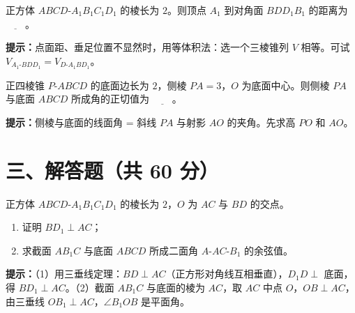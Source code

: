 \documentclass{exam-zh}
\begin{document}
\begin{question}[points=10]
  正方体 $ABCD\text{-}A_1B_1C_1D_1$ 的棱长为 $2$。则顶点 $A_1$ 到对角面 $BDD_1B_1$ 的距离为 $\underline{\hspace{2em}}$。
  \begin{hintbox}
\textbf{提示：}点面距、垂足位置不显然时，用等体积法：选一个三棱锥列 $V$ 相等。可试 $V_{A_1\text{-}BDD_1}=V_{D\text{-}A_1BD_1}$。\end{hintbox}

\end{question}



\begin{question}[points=10]
  正四棱锥 $P\text{-}ABCD$ 的底面边长为 $2$，侧棱 $PA=3$，$O$ 为底面中心。则侧棱 $PA$ 与底面 $ABCD$ 所成角的正切值为 $\underline{\hspace{2em}}$。
  \begin{hintbox}
\textbf{提示：}侧棱与底面的线面角 = 斜线 $PA$ 与射影 $AO$ 的夹角。先求高 $PO$ 和 $AO$。\end{hintbox}

\end{question}


\section*{三、解答题（共 60 分）}


\begin{problem}[points=12]
    正方体 $ABCD\text{-}A_1B_1C_1D_1$ 的棱长为 $2$，$O$ 为 $AC$ 与 $BD$ 的交点。
\begin{enumerate}[label=(\arabic*)]
  \item 证明 $BD_1\perp AC$；
  \item 求截面 $AB_1C$ 与底面 $ABCD$ 所成二面角 $A\text{-}AC\text{-}B_1$ 的余弦值。
\end{enumerate}

    \begin{hintbox}
\textbf{提示：}（1）用三垂线定理：$BD\perp AC$（正方形对角线互相垂直），$D_1D\perp$ 底面，得 $BD_1\perp AC$。（2）截面 $AB_1C$ 与底面的棱为 $AC$，取 $AC$ 中点 $O$，$OB\perp AC$，由三垂线 $OB_1\perp AC$，$\angle B_1OB$ 是平面角。\end{hintbox}

  \answerarea[62mm]
\end{problem}


\end{document}
